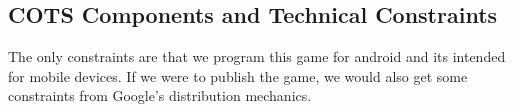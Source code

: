 \subsection{COTS Components and Technical Constraints}

The only constraints are that we program this game for android and its intended for mobile devices. If we were to publish the game, we would also get some constraints from Google’s distribution mechanics.